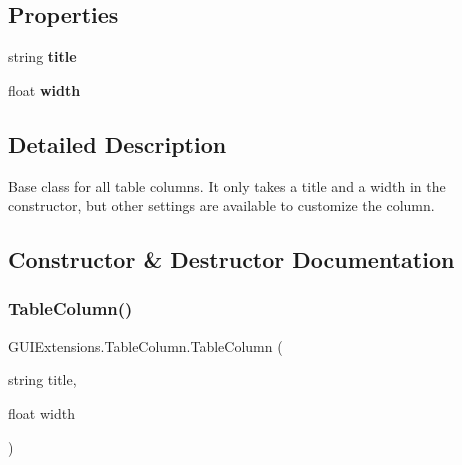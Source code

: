 \subsection*{Properties}
\begin{DoxyCompactItemize}
\item 
\mbox{\label{class_g_u_i_extensions_1_1_table_column_aaaec6ba370e158472aac5940a943b117}} 
string {\bfseries title}
\item 
\mbox{\label{class_g_u_i_extensions_1_1_table_column_a07863be1efd646e6238399f2cccfd9f2}} 
float {\bfseries width}
\end{DoxyCompactItemize}


\subsection{Detailed Description}
Base class for all table columns. It only takes a title and a width in the constructor, but other settings are available to customize the column. 



\subsection{Constructor \& Destructor Documentation}
\mbox{\label{class_g_u_i_extensions_1_1_table_column_a27389bffc8435c64dbdc03c96d396383}} 
\subsubsection{\texorpdfstring{Table\+Column()}{TableColumn()}}
{\footnotesize\ttfamily G\+U\+I\+Extensions.\+Table\+Column.\+Table\+Column (\begin{DoxyParamCaption}\item[{string}]{title,  }\item[{float}]{width }\end{DoxyParamCaption})}



